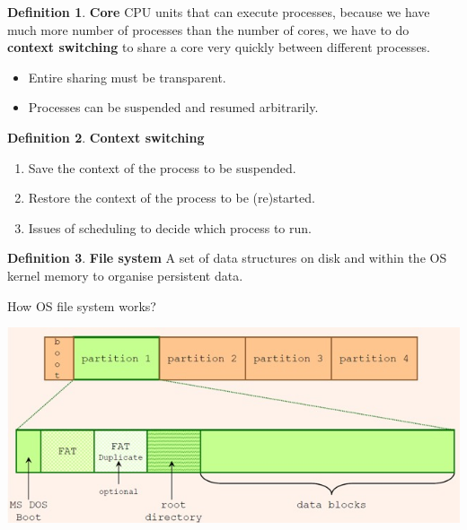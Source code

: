 \documentclass[12pt,a4paper]{article}
\theoremstyle{definition}
\newtheorem{definition}{Definition}[section]
\newenvironment{myitemize}
{ \begin{itemize}
    \setlength{\itemsep}{5pt}
    \setlength{\parskip}{0pt}
    \setlength{\parsep}{0pt}     }
{ \end{itemize}                  }
\newenvironment{myenumerate}
{ \begin{enumerate}
    \setlength{\itemsep}{5pt}
    \setlength{\parskip}{0pt}
    \setlength{\parsep}{0pt}     }
{ \end{enumerate}                }
\begin{document}
\begin{definition}{\textbf{Core}}
	CPU units that can execute processes, because we have much more number of processes than the number of cores, we have to do \textbf{context switching} to share a core very quickly between different processes.
	\begin{myitemize}
		\item Entire sharing must be transparent.
		\item Processes can be suspended and resumed arbitrarily.
	\end{myitemize}
\end{definition}

\begin{definition}{\textbf{Context switching}}
	\begin{myenumerate}
		\item Save the \textsf{context} of the process to be suspended.
		\item Restore the \textsf{context} of the process to be (re)started.
		\item Issues of \textsf{scheduling} to decide which process to run.
	\end{myenumerate}
\end{definition}

\begin{definition}{\textbf{File system}}
	A set of data structures on disk and within the OS kernel memory to organise persistent data.
\end{definition}

\begin{tcolorbox}
\textsf{How OS file system works?}

	\includegraphics[scale=0.3]{m1/fileSystem}
	\centering
\end{tcolorbox}
\end{document}
